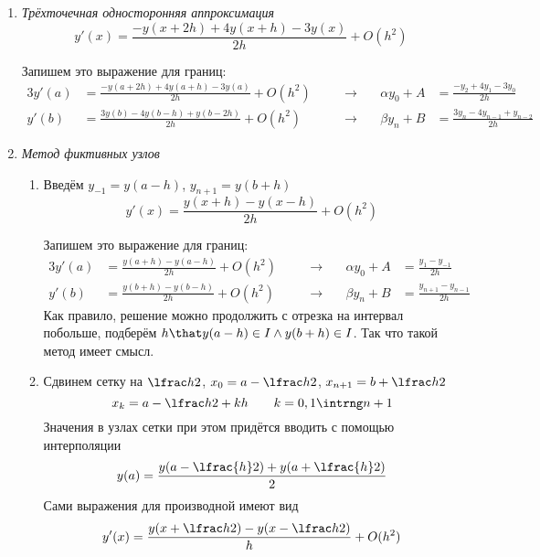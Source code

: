 \documentclass{trlnotes}
\begin{document}
\begin{enumerate}
  \item \emph{Трёхточечная односторонняя аппроксимация}
      \begin{equation*}
        y'(x) = \frac{-y(x+2h) + 4y(x+h) - 3 y(x)}{2h} + O(h^2)
      \end{equation*}

      Запишем это выражение для границ:
      \begin{alignat*}{3}
        y'(a) &= \frac{-y(a+2h) + 4y(a+h) - 3 y(a)}{2h} + O(h^2) 
              &\quad&\to\quad &
        αy_0 + A &= \frac{-y_2 + 4 y_1 - 3y_0}{2h}\\
        y'(b) &= \frac{3y(b) - 4y(b-h) + y(b-2h)}{2h} + O(h^2) 
              &\quad&\to\quad &
        βy_n + B &= \frac{3y_n - 4 y_{n-1} + y_{n-2}}{2h}
      \end{alignat*}
    \item \emph{Метод фиктивных узлов}
      \begin{enumerate}
        \item Введём $y_{-1} = y(a-h)$, $y_{n+1} = y(b+h)$
          \begin{equation*}
            y'(x) = \frac{y(x+h) - y(x-h)}{2h} + O(h^2)
          \end{equation*}

          Запишем это выражение для границ:
          \begin{alignat*}{3}
            y'(a) &= \frac{y(a+h) - y(a-h)}{2h} + O(h^2) 
                  &\quad&\to\quad &
            αy_0 + A &= \frac{y_1 - y_{-1}}{2h}\\
            y'(b) &= \frac{y(b+h) - y(b-h)}{2h} + O(h^2) 
                  &\quad&\to\quad &
            βy_n + B &= \frac{y_{n+1} - y_{n-1}}{2h}
          \end{alignat*}
          Как правило, решение можно продолжить с отрезка на интервал побольше, подберём
          $h \that y(a-h) \in I \land y(b+h) \in I$. Так что такой метод имеет смысл.
        \item Сдвинем сетку на $\lfrac h2$, $x_0 = a-\lfrac h2$, $x_{n+1} = b+\lfrac h2$
          \[
            x_k = a- \lfrac h2 + kh \qquad k = 0,1 \intrng n+1
          \]
          Значения в узлах сетки при этом придётся вводить с помощью интерполяции
          \[
            y(a) = \frac{y(a-\lfrac{h}2) + y(a+\lfrac{h}2)}{2}
          \]
          Сами выражения для производной имеют вид
          \begin{equation*}
            y'(x) = \frac{y(x+\lfrac h2) - y(x-\lfrac h2)}{h} + O(h^2)
          \end{equation*}


\end{enumerate}
\end{enumerate}
\end{document}
